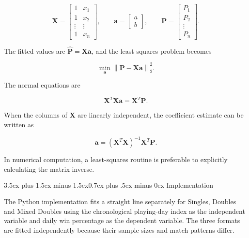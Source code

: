 \documentclass[journal]{IEEEtran}
\makeatletter
\renewcommand\subsection{\@startsection{subsection}{2}{\z@}%
  {3.5ex plus 1.5ex minus 1.5ex}{0.7ex plus .5ex minus 0ex}%
  {\normalfont\normalsize\bfseries\upshape\color{red}}}
\numberwithin{equation}{subsection}
\makeatother
\begin{document}
\[
\mathbf{X}=\begin{bmatrix}
1 & x_1\\
1 & x_2\\
\vdots & \vdots\\
1 & x_n
\end{bmatrix},\qquad
\mathbf{a}=\begin{bmatrix}a\\b\end{bmatrix},\qquad
\mathbf{P}=\begin{bmatrix}P_1\\P_2\\\vdots\\P_n\end{bmatrix}.
\]

The fitted values are \(\widehat{\mathbf{P}}=\mathbf{X}\mathbf{a}\),
and the least-squares problem becomes

\begin{equation}
\min_{\mathbf{a}}\left\|\mathbf{P}-\mathbf{X}\mathbf{a}\right\|_2^2.
\label{eq:matrix-least-squares}
\end{equation}

The normal equations are

\begin{equation}
\mathbf{X}^{T}\mathbf{X}\mathbf{a}=\mathbf{X}^{T}\mathbf{P}.
\label{eq:normal-equations}
\end{equation}

When the columns of \(\mathbf{X}\) are linearly independent,
the coefficient estimate can be written as

\begin{equation}
\mathbf{a}=(\mathbf{X}^{T}\mathbf{X})^{-1}
\mathbf{X}^{T}\mathbf{P}.
\label{eq:coefficient-solution}
\end{equation}

In numerical computation, a least-squares routine is
preferable to explicitly calculating the matrix inverse.

\subsection{Implementation}

The Python implementation fits a straight line separately
for Singles, Doubles and Mixed Doubles using the chronological
playing-day index as the independent variable and daily win
percentage as the dependent variable. The three formats are
fitted independently because their sample sizes and match
patterns differ.
\end{document}
